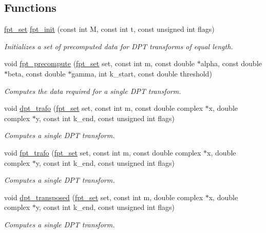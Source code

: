 \subsection*{Functions}
\begin{CompactItemize}
\item 
\hyperlink{structfpt__set__s__}{fpt\_\-set} \hyperlink{group__fpt_ga1}{fpt\_\-init} (const int M, const int t, const unsigned int flags)
\begin{CompactList}\small\item\em Initializes a set of precomputed data for DPT transforms of equal length. \item\end{CompactList}\item 
void \hyperlink{group__fpt_ga2}{fpt\_\-precompute} (\hyperlink{structfpt__set__s__}{fpt\_\-set} set, const int m, const double $\ast$alpha, const double $\ast$beta, const double $\ast$gamma, int k\_\-start, const double threshold)
\begin{CompactList}\small\item\em Computes the data required for a single DPT transform. \item\end{CompactList}\item 
void \hyperlink{group__fpt_ga3}{dpt\_\-trafo} (\hyperlink{structfpt__set__s__}{fpt\_\-set} set, const int m, const double complex $\ast$x, double complex $\ast$y, const int k\_\-end, const unsigned int flags)
\begin{CompactList}\small\item\em Computes a single DPT transform. \item\end{CompactList}\item 
void \hyperlink{group__fpt_ga4}{fpt\_\-trafo} (\hyperlink{structfpt__set__s__}{fpt\_\-set} set, const int m, const double complex $\ast$x, double complex $\ast$y, const int k\_\-end, const unsigned int flags)
\begin{CompactList}\small\item\em Computes a single DPT transform. \item\end{CompactList}\item 
void \hyperlink{group__fpt_ga5}{dpt\_\-transposed} (\hyperlink{structfpt__set__s__}{fpt\_\-set} set, const int m, double complex $\ast$x, double complex $\ast$y, const int k\_\-end, const unsigned int flags)
\begin{CompactList}\small\item\em Computes a single DPT transform. \item\end{CompactList}\item 

\end{CompactItemize}
